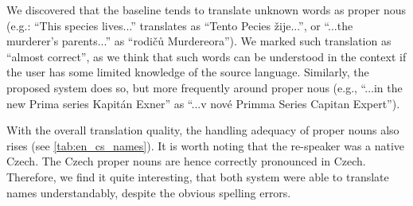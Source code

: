 We discovered that the baseline tends to translate unknown words as proper nous (e.g.: ``This species lives...'' translates as ``Tento Pecies žije...'', or ``...the murderer's parents...'' as ``rodičů Murdereora''). We marked such translation as ``almost correct'', as we think that such words can be understood in the context if the user has some limited knowledge of the source language. Similarly, the proposed system does so, but more frequently around proper nous (e.g., ``...in the new Prima series Kapitán Exner'' as ``...v nové Primma Series Capitan Expert'').

With the overall translation quality, the handling adequacy of proper nouns also rises (see \cref{tab:en_cs_names}). It is worth noting that the re-speaker was a native Czech. The Czech proper nouns are hence correctly pronounced in Czech. Therefore, we find it quite interesting, that both system were able to translate names understandably, despite the obvious spelling errors.

